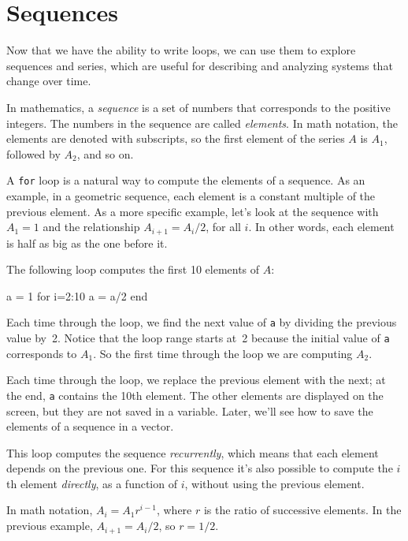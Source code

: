 \section{Sequences}

Now that we have the ability to write loops, we can use them to explore sequences and series, which are useful for describing and analyzing systems that change over time.

In mathematics, a \emph{sequence} is a set of numbers that corresponds to the positive integers.  The numbers in the sequence are called \emph{elements}.  In math notation, the elements are denoted with subscripts, so the first element of the series $A$ is
$A_1$, followed by $A_2$, and so on.


A \lstinline{for} loop is a natural way to compute the elements of a sequence.
As an example, in a geometric sequence, each element is a constant
multiple of the previous element.  As a more specific example, let's
look at the sequence with $A_1 = 1$ and the relationship $A_{i+1} = A_i/2$,
for all $i$.  In other words, each element is half as big as the one before it.

The following loop computes the first 10 elements of $A$:

\begin{code}
a = 1
for i=2:10
    a = a/2
end
\end{code}

Each time through the loop, we find the next value of \lstinline{a}
by dividing the previous value by~2.  Notice that the loop
range starts at~2 because the initial value of \lstinline{a} corresponds
to $A_1$.  So the first time through the loop we are computing
$A_2$.

Each time through the loop, we replace the previous element with
the next; at the end, \lstinline{a} contains the 10th element.  The
other elements are displayed on the screen, but they are not saved
in a variable.  Later, we'll see how to save the elements
of a sequence in a vector.


This loop computes the sequence \emph{recurrently}, which means
that each element depends on the previous one.
For this sequence it's also possible to compute the $i$th element
\emph{directly}, as a function of $i$, without using the previous element.

In math notation, $A_i = A_1 r^{i-1}$, where $r$ is the ratio of successive elements.
In the previous example, $A_{i+1} = A_i/2$, so $r = 1/2$.

